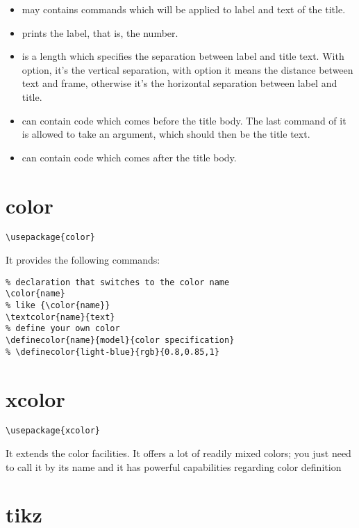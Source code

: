 \begin{itemize}
\begin{itemize}
  \end{itemize}
\item {} may contains commands which will be applied to label and text of the title.
\item {} prints the label, that is, the number.
\item {} is a length which specifies the separation between label and title text. With  option, it’s the vertical separation, with  option it means the distance between text and frame, otherwise it’s the horizontal separation between label and title.
\item {} can contain code which comes before the title body. The last command of it is allowed to take an argument, which should then be the title text.
\item {} can contain code which comes after the title body.
\end{itemize}


\section{color}
\label{sec:color}
\begin{lstlisting}
\usepackage{color}
\end{lstlisting}


It provides the following commands:
\begin{lstlisting}
% declaration that switches to the color name
\color{name}
% like {\color{name}}
\textcolor{name}{text} 
% define your own color
\definecolor{name}{model}{color specification}
% \definecolor{light-blue}{rgb}{0.8,0.85,1}
\end{lstlisting}


\section{xcolor}
\label{sec:xcolor}
\begin{lstlisting}
\usepackage{xcolor}
\end{lstlisting}

It extends the color facilities.
It offers a lot of readily mixed colors; you just need to call it by its name and it has powerful capabilities regarding color definition


\section{tikz}
\label{sec:tikz}

